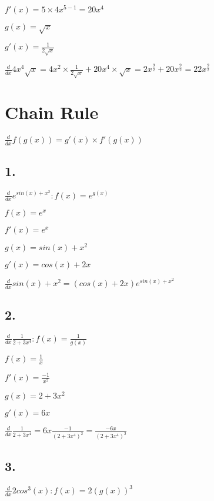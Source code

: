 \documentclass[12pt,a4paper]{article}
\begin{document}
\noindent $f'(x) = 5 \times 4 x^{5-1} = 20 x^4$

\noindent $g(x) = \sqrt{x}$

\noindent $g'(x) = \frac{1}{2\sqrt{x}}$
\newline

\noindent $\frac{d}{dx} 4x^4 \sqrt{x} = 4x^2 \times \frac{1}{2\sqrt{x}} + 20x^4 \times \sqrt{x} = 2x^{\frac{9}{2}} + 20x^{\frac{9}{2}} = 22x^{\frac{9}{2}}$

\newpage

\section*{Chain Rule}

\noindent $\frac{d}{dx} f(g(x)) = g'(x) \times f'(g(x))$

\subsection*{1.}
\noindent $\frac{d}{dx} e^{sin(x)+x^2}: f(x) = e^{g(x)}$
\newline

\noindent $f(x) = e^x$

\noindent $f'(x) = e^x$

\noindent $g(x) = sin(x) + x^2$

\noindent $g'(x) = cos(x) + 2x$
\newline

\noindent $\frac{d}{dx} sin(x) + x^2 = (cos(x) + 2x)e^{sin(x)+x^2}$

\subsection*{2.}
\noindent $\frac{d}{dx} \frac{1}{2+3x^4}: f(x) = \frac{1}{g(x)}$
\newline

\noindent $f(x) = \frac{1}{x}$

\noindent $f'(x) = \frac{-1}{x^2}$

\noindent $g(x) = 2 + 3x^2$

\noindent $g'(x) = 6x$
\newline

\noindent $\frac{d}{dx} \frac{1}{2+3x^4} = 6x\frac{-1}{(2+3x^4)^2} = \frac{-6x}{(2+3x^4)^2}$

\subsection*{3.}
\noindent $\frac{d}{dx} 2cos^3 (x): f(x) = 2(g(x))^3$
\newline
\end{document}
